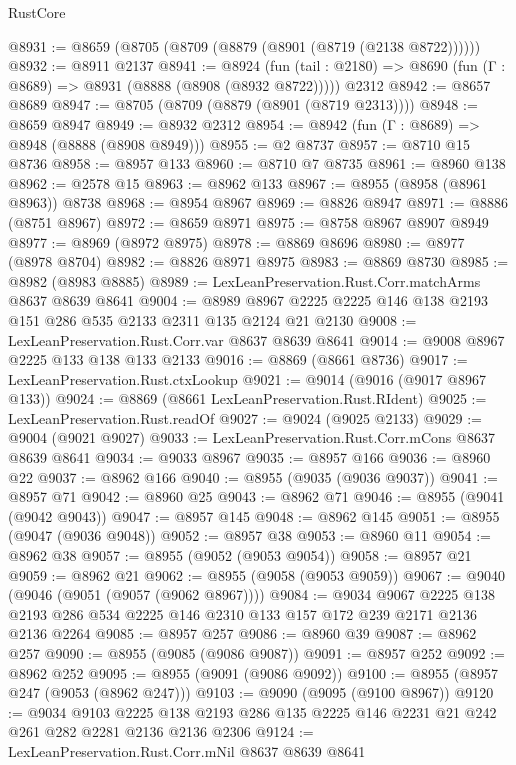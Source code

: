 \begin{lexlean}{RustCore}
\begin{coremodule}
@8931 := @8659 (@8705 (@8709 (@8879 (@8901 (@8719 (@2138 @8722))))))
@8932 := @8911 @2137
@8941 := @8924
    (fun (tail : @2180) => @8690 (fun (Γ : @8689) => @8931 (@8888 (@8908 (@8932 @8722)))))
    @2312
@8942 := @8657 @8689
@8947 := @8705 (@8709 (@8879 (@8901 (@8719 @2313))))
@8948 := @8659 @8947
@8949 := @8932 @2312
@8954 := @8942 (fun (Γ : @8689) => @8948 (@8888 (@8908 @8949)))
@8955 := @2 @8737
@8957 := @8710 @15 @8736
@8958 := @8957 @133
@8960 := @8710 @7 @8735
@8961 := @8960 @138
@8962 := @2578 @15
@8963 := @8962 @133
@8967 := @8955 (@8958 (@8961 @8963)) @8738
@8968 := @8954 @8967
@8969 := @8826 @8947
@8971 := @8886 (@8751 @8967)
@8972 := @8659 @8971
@8975 := @8758 @8967 @8907 @8949
@8977 := @8969 (@8972 @8975)
@8978 := @8869 @8696
@8980 := @8977 (@8978 @8704)
@8982 := @8826 @8971 @8975
@8983 := @8869 @8730
@8985 := @8982 (@8983 @8885)
@8989 := LexLeanPreservation.Rust.Corr.matchArms @8637 @8639 @8641
@9004 := @8989 @8967 @2225 @2225 @146 @138 @2193 @151 @286 @535 @2133 @2311 @135 @2124 @21 @2130
@9008 := LexLeanPreservation.Rust.Corr.var @8637 @8639 @8641
@9014 := @9008 @8967 @2225 @133 @138 @133 @2133
@9016 := @8869 (@8661 @8736)
@9017 := LexLeanPreservation.Rust.ctxLookup
@9021 := @9014 (@9016 (@9017 @8967 @133))
@9024 := @8869 (@8661 LexLeanPreservation.Rust.RIdent)
@9025 := LexLeanPreservation.Rust.readOf
@9027 := @9024 (@9025 @2133)
@9029 := @9004 (@9021 @9027)
@9033 := LexLeanPreservation.Rust.Corr.mCons @8637 @8639 @8641
@9034 := @9033 @8967
@9035 := @8957 @166
@9036 := @8960 @22
@9037 := @8962 @166
@9040 := @8955 (@9035 (@9036 @9037))
@9041 := @8957 @71
@9042 := @8960 @25
@9043 := @8962 @71
@9046 := @8955 (@9041 (@9042 @9043))
@9047 := @8957 @145
@9048 := @8962 @145
@9051 := @8955 (@9047 (@9036 @9048))
@9052 := @8957 @38
@9053 := @8960 @11
@9054 := @8962 @38
@9057 := @8955 (@9052 (@9053 @9054))
@9058 := @8957 @21
@9059 := @8962 @21
@9062 := @8955 (@9058 (@9053 @9059))
@9067 := @9040 (@9046 (@9051 (@9057 (@9062 @8967))))
@9084 := @9034
    @9067
    @2225
    @138
    @2193
    @286
    @534
    @2225
    @146
    @2310
    @133
    @157
    @172
    @239
    @2171
    @2136
    @2136
    @2264
@9085 := @8957 @257
@9086 := @8960 @39
@9087 := @8962 @257
@9090 := @8955 (@9085 (@9086 @9087))
@9091 := @8957 @252
@9092 := @8962 @252
@9095 := @8955 (@9091 (@9086 @9092))
@9100 := @8955 (@8957 @247 (@9053 (@8962 @247)))
@9103 := @9090 (@9095 (@9100 @8967))
@9120 := @9034
    @9103
    @2225
    @138
    @2193
    @286
    @135
    @2225
    @146
    @2231
    @21
    @242
    @261
    @282
    @2281
    @2136
    @2136
    @2306
@9124 := LexLeanPreservation.Rust.Corr.mNil @8637 @8639 @8641

\end{coremodule}
\end{lexlean}
